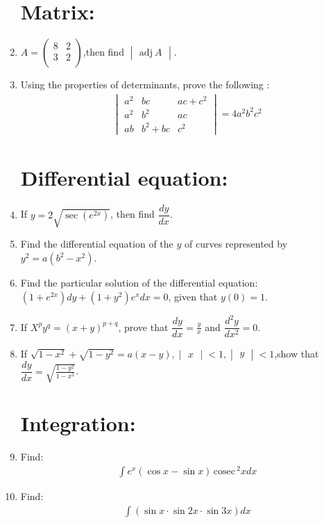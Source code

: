 \documentclass[10pt,-letter paper]{article}
\providecommand{\brak}[1]{\ensuremath{\left(#1\right)}}
\newcommand{\cosec}{\,\text{cosec}\,}
\newcommand{\myvec}[1]{\ensuremath{\begin{pmatrix}#1\end{pmatrix}}}
\newcommand{\mydet}[1]{\ensuremath{\begin{vmatrix}#1\end{vmatrix}}}
\begin{document}
\begin{enumerate}
\section{Matrix:}

\item $A = \myvec{
		8 & 2 \\ 
		3 & 2 \\}$,then find $\mydet{\text{adj}~ A}$.

\item Using the properties of determinants, prove the following :
        \begin{align*}
		\mydet{a^{2} & bc & ac+c^{2} \\ a^{2} & b^{2} & ac \\ ab & b^{2}+bc & c^{2} } = 4a^{2}b^{2}c^{2} 
	  \end{align*}
 
\section{Differential equation:}

\item If $y = 2\sqrt{\sec\brak{e^{2x}}}$, then find $\dfrac{dy}{dx}$.

\item Find the differential equation of the $y$ of curves represented by $y^{2}=a\brak{b^{2}-x^{2}}$.

\item Find the particular solution of the differential equation: $\brak{1+e^{2x}}{dy}+\brak{1+y{^2}}{e^{x}{dx}}=0$, given that $y\brak{0}=1$.

\item If $X^{p}y^{q}= \brak{x+y}^{p+q}$, prove that $\dfrac{dy}{dx}=\frac{y}{x}$ and $\dfrac{d^{2}y}{dx^{2}}=0$.

\item If $\sqrt{1-x^{2}}+\sqrt{1-y{^2}}=a\brak{x-y},\mydet{x}<1,\mydet{y}<1$,show that $\dfrac{dy}{dx}=\sqrt{\frac{1-y^{2}}{1-x^{2}}}$. 

\section{Integration:}

\item Find:
	\begin{align*}
		\int e^{x}\brak{\cos{x}-\sin{x}}\cosec^2{x} dx
	\end{align*}

 \item Find:
 \begin{align*}
         \int{\brak{\sin{x} \cdot \sin{2x} \cdot \sin{3x}}dx}
 \end{align*}



\end{enumerate}
\end{document}
